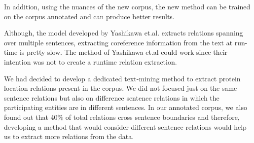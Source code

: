 In addition, using the nuances of the new corpus, the new method can be trained on the corpus annotated and can produce better results.

Although, the model developed by Yashikawa et.al. extracts relations spanning over multiple sentences, extracting coreference information from the text at run-time is pretty slow. The method of Yashikawa et.al could work since their intention was not to create a runtime relation extraction.

We had decided to develop a dedicated text-mining method to extract protein location relations present in the corpus. We did not focused just on the same sentence relations but also on difference sentence relations in which the participating entities are in different sentences. In our annotated corpus, we also found out that 40\% of total relations cross sentence boundaries and therefore, developing a method that would consider different sentence relations would help us to extract more relations from the data.




















